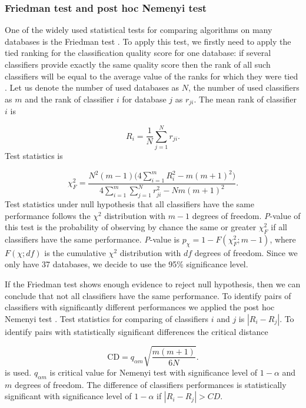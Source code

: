\documentclass[entropy,article,submit,moreauthors,pdftex]{Definitions/mdpi}
\begin{document}
\subsubsection{Friedman test and post hoc Nemenyi test}
One of the widely used statistical tests for comparing algorithms on many databases is the Friedman test \cite{friedman1940comparison, friedman1937use}. To apply this test, we firstly need to apply the tied ranking for the classification quality score for one database: if several classifiers provide exactly the same quality score then the rank of all such classifiers will be equal to the average value of the ranks for which they were tied \cite{friedman1937use}. Let us denote the number of used databases as $N$, the number of used classifiers as $m$ and the rank of classifier $i$ for database $j$ as $r_{ji}$. The mean rank of classifier $i$ is

\begin{equation*}
R_i=\frac{1}{N}\sum_{j=1}^{N} r_{ji}.
\end{equation*}
Test statistics is

\begin{equation*}
\chi^2_F=\frac{N^2(m-1)\Big(4\sum_{i=1}^{m} R_{i}^2 -m(m+1)^2\Big)}{4\sum_{i=1}^{m}\sum_{j=1}^{N} r_{ji}^2 -Nm(m+1)^2}.
\end{equation*}
Test statistics under null hypothesis that all classifiers have the same performance follows the $\chi^2$ distribution with $m-1$ degrees of freedom. \emph{P}-value of this test is the probability of observing by chance the same or greater $\chi^2_F$ if all classifiers have the same performance. \emph{P}-value is $p_\chi=1-F(\chi^2_F; m-1)$, where $F(\chi; df)$ is the cumulative $\chi^2$ distribution with $df$ degrees of freedom. Since we only have 37 databases, we decide to use the 95\% significance level.

If the Friedman test shows enough evidence to reject null hypothesis, then we can conclude that not all classifiers have the same performance. To identify pairs of classifiers with significantly different performances we applied the post hoc Nemenyi test \cite{nemenyi1962distribution}. Test statistics for comparing of classifiers $i$ and $j$ is $|R_i-R_j|$. To identify pairs with statistically significant differences the critical distance

\begin{equation*}
\text{CD}=q_{\alpha m} \sqrt{\frac{m(m+1)}{6N}}.
\end{equation*}
is used. $q_{\alpha m}$ is critical value for Nemenyi test with significance level of $1-\alpha$ and $m$ degrees of freedom. The difference of classifiers performances is statistically significant with significance level of $1-\alpha$ if $|R_i-R_j|>CD$.
\end{document}
